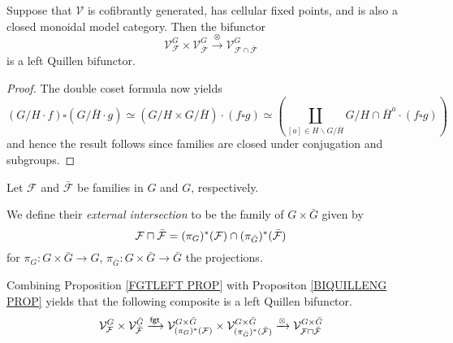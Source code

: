 \documentclass[a4paper,10pt]{article}%
\begin{document}
\begin{proposition}\label{BIQUILLENG PROP}
  Suppose that $\mathcal{V}$ is cofibrantly generated, has cellular fixed points, and is also a closed monoidal model category. 	
  Then the bifunctor
  \begin{equation}\label{BIQUILLENG EQ}
    \mathcal{V}^G_{\mathcal{F}}
    \times
    \mathcal{V}^G_{\bar{\mathcal{F}}}
    \xrightarrow{\otimes}
    \mathcal{V}^G_{\mathcal{F} \cap \bar{\mathcal{F}}}
  \end{equation}
  is a left Quillen bifunctor.
\end{proposition}


\begin{proof}
  The double coset formula now yields
  \begin{equation}
    \left(G/H \cdot f\right) \square \left(G/\bar{H} \cdot g\right)
    \simeq
    \left(G/H \times G/\bar{H}\right) \cdot \left(f \square g\right)
    \simeq
    \left(
      \coprod_{[a]\in H \backslash G /\bar{H}}
      {G/H\cap \bar{H}^a} \cdot (f \square g)
    \right)
  \end{equation}
  and hence the result follows since families are closed under conjugation and subgroups.
\end{proof}


\begin{definition}\label{EXTERINT DEF}
  Let $\mathcal{F}$ and $\bar{\mathcal{F}}$ be families in $G$ and $G$, respectively.

  We define their \textit{external intersection} to be the 
  family of $G \times \bar{G}$ given by
  \[
  \mathcal{F} \sqcap \bar{\mathcal{F}}
  =
  (\pi_{G})^{\**} (\mathcal{F}) 
  \cap
  (\pi_{\bar{G}})^{\**} (\bar{\mathcal{F}})
  \]
  for 
  $\pi_G \colon G \times \bar{G} \to G$,
  $\pi_{\bar{G}} \colon G \times \bar{G} \to \bar{G}$
  the projections.
\end{definition}


\begin{remark}
  Combining Proposition \ref{FGTLEFT PROP} 
  with Propositon \ref{BIQUILLENG PROP} yields that
  the following composite is a left Quillen bifunctor.
  \begin{equation}\label{EXTERINTADJ EQ}
    \mathcal{V}^{G}_{\mathcal{F}}
    \times
    \mathcal{V}^{\bar{G}}_{\bar{\mathcal{F}}}
    \xrightarrow{\mathsf{fgt}}
    \mathcal{V}^{G \times \bar{G}}_{
      (\pi_G)^{\**}(\mathcal{F})}
    \times
    \mathcal{V}^{G \times \bar{G}}_{
      (\pi_{\bar{G}})^{\**}(\bar{\mathcal{F}})}
    \xrightarrow{\otimes}
    \mathcal{V}^{G \times \bar{G}}_{
      \mathcal{F} \sqcap \bar{\mathcal{F}}}
  \end{equation}
\end{remark}
\end{document}
